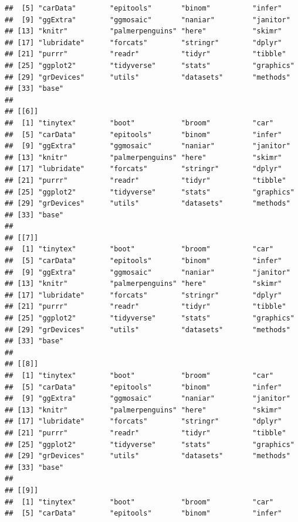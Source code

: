 \documentclass[
]{book}
\begin{document}
\begin{verbatim}
##  [5] "carData"        "epitools"       "binom"          "infer"         
##  [9] "ggExtra"        "ggmosaic"       "naniar"         "janitor"       
## [13] "knitr"          "palmerpenguins" "here"           "skimr"         
## [17] "lubridate"      "forcats"        "stringr"        "dplyr"         
## [21] "purrr"          "readr"          "tidyr"          "tibble"        
## [25] "ggplot2"        "tidyverse"      "stats"          "graphics"      
## [29] "grDevices"      "utils"          "datasets"       "methods"       
## [33] "base"          
## 
## [[6]]
##  [1] "tinytex"        "boot"           "broom"          "car"           
##  [5] "carData"        "epitools"       "binom"          "infer"         
##  [9] "ggExtra"        "ggmosaic"       "naniar"         "janitor"       
## [13] "knitr"          "palmerpenguins" "here"           "skimr"         
## [17] "lubridate"      "forcats"        "stringr"        "dplyr"         
## [21] "purrr"          "readr"          "tidyr"          "tibble"        
## [25] "ggplot2"        "tidyverse"      "stats"          "graphics"      
## [29] "grDevices"      "utils"          "datasets"       "methods"       
## [33] "base"          
## 
## [[7]]
##  [1] "tinytex"        "boot"           "broom"          "car"           
##  [5] "carData"        "epitools"       "binom"          "infer"         
##  [9] "ggExtra"        "ggmosaic"       "naniar"         "janitor"       
## [13] "knitr"          "palmerpenguins" "here"           "skimr"         
## [17] "lubridate"      "forcats"        "stringr"        "dplyr"         
## [21] "purrr"          "readr"          "tidyr"          "tibble"        
## [25] "ggplot2"        "tidyverse"      "stats"          "graphics"      
## [29] "grDevices"      "utils"          "datasets"       "methods"       
## [33] "base"          
## 
## [[8]]
##  [1] "tinytex"        "boot"           "broom"          "car"           
##  [5] "carData"        "epitools"       "binom"          "infer"         
##  [9] "ggExtra"        "ggmosaic"       "naniar"         "janitor"       
## [13] "knitr"          "palmerpenguins" "here"           "skimr"         
## [17] "lubridate"      "forcats"        "stringr"        "dplyr"         
## [21] "purrr"          "readr"          "tidyr"          "tibble"        
## [25] "ggplot2"        "tidyverse"      "stats"          "graphics"      
## [29] "grDevices"      "utils"          "datasets"       "methods"       
## [33] "base"          
## 
## [[9]]
##  [1] "tinytex"        "boot"           "broom"          "car"           
##  [5] "carData"        "epitools"       "binom"          "infer"         

\end{verbatim}
\end{document}
